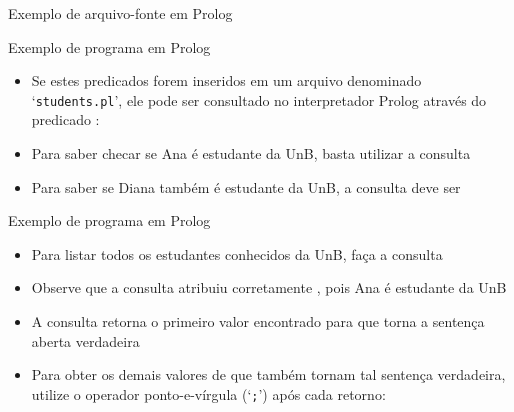 \begin{frame}[fragile]{Exemplo de arquivo-fonte em Prolog}


\end{frame}


\begin{frame}[fragile]{Exemplo de programa em Prolog}

    \begin{itemize}
        \item Se estes predicados forem inseridos em um arquivo denominado 
            `\texttt{students.pl}', ele pode ser consultado no interpretador Prolog
            através do predicado :


        \item Para saber checar se Ana é estudante da UnB, basta utilizar a consulta


        \item Para saber se Diana também é estudante da UnB, a consulta deve ser 

    \end{itemize}

\end{frame}

\begin{frame}[fragile]{Exemplo de programa em Prolog}

    \begin{itemize}
        \item Para listar todos os estudantes conhecidos da UnB, faça a consulta


        \item Observe que a consulta atribuiu corretamente , pois
            Ana é estudante da UnB

        \item A consulta retorna o primeiro valor encontrado para  que
            torna a sentença aberta  verdadeira

        \item Para obter os demais valores de  que também tornam tal sentença
            verdadeira, utilize o operador ponto-e-vírgula (`\texttt{;}') após cada retorno:

    \end{itemize}

\end{frame}

